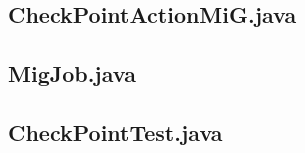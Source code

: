 \begin{landscape}
\begin{multicols}{2}
\subsection{CheckPointActionMiG.java}

\subsection{MigJob.java}

\subsection{CheckPointTest.java}

\end{multicols}
\end{landscape}